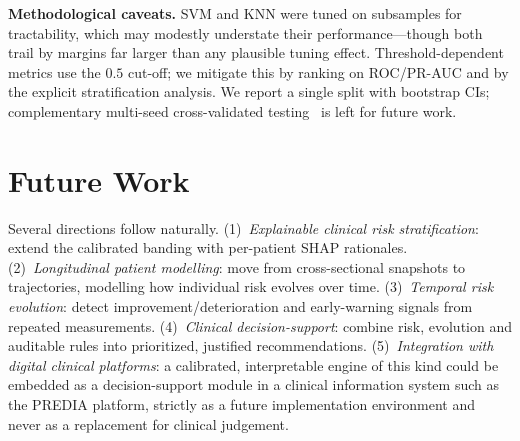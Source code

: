 \documentclass[conference]{IEEEtran}
\begin{document}
\textbf{Methodological caveats.} SVM and KNN were tuned on subsamples for tractability,
which may modestly understate their performance---though both trail by margins far larger
than any plausible tuning effect. Threshold-dependent metrics use the $0.5$ cut-off; we
mitigate this by ranking on ROC/PR-AUC and by the explicit stratification analysis. We
report a single split with bootstrap CIs; complementary multi-seed cross-validated
testing~\cite{demsar2006statistical} is left for future work.

\section{Future Work}
Several directions follow naturally. (1)~\emph{Explainable clinical risk
stratification}: extend the calibrated banding with per-patient SHAP rationales.
(2)~\emph{Longitudinal patient modelling}: move from cross-sectional snapshots to
trajectories, modelling how individual risk evolves over time. (3)~\emph{Temporal risk
evolution}: detect improvement/deterioration and early-warning signals from repeated
measurements. (4)~\emph{Clinical decision-support}: combine risk, evolution and
auditable rules into prioritized, justified recommendations. (5)~\emph{Integration with
digital clinical platforms}: a calibrated, interpretable engine of this kind could be
embedded as a decision-support module in a clinical information system such as the
PREDIA platform, strictly as a future implementation environment and never as a
replacement for clinical judgement.
\end{document}

